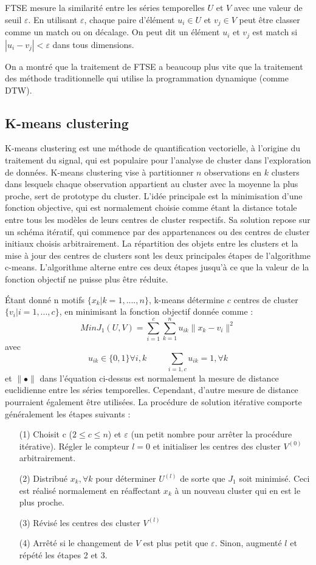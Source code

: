 FTSE mesure la similarité entre les séries temporelles $U$ et $V$ avec une valeur de seuil $\varepsilon$. En utilisant $\varepsilon$, chaque paire d'élément $u_i \in U$ et $v_j \in V$ peut être classer comme un match ou on décalage. On peut dit un élément $u_i$ et $v_j$ est match si $| u_i - v_j | <  \varepsilon$ dans tous dimensions.

On a montré que la traitement de FTSE a beaucoup plus vite que la traitement des méthode traditionnelle qui utilise la programmation dynamique (comme DTW).
\subsection{K-means clustering}
K-means clustering est une méthode de quantification vectorielle, à l'origine du traitement du signal, qui est populaire pour l'analyse de cluster dans l'exploration de données. K-means clustering vise à partitionner $n$ observations en $k$ clusters dans lesquels chaque observation appartient au cluster avec la moyenne la plus proche, sert de prototype du cluster. L'idée principale est la minimisation d'une fonction objective, qui est normalement choisie comme étant la distance totale entre tous les modèles de leurs centres de cluster respectifs. Sa solution repose sur un schéma itératif, qui commence par des appartenances ou des centres de cluster initiaux choisis arbitrairement. La répartition des objets entre les clusters et la mise à jour des centres de clusters sont les deux principales étapes de l'algorithme c-means. L'algorithme alterne entre ces deux étapes jusqu'à ce que la valeur de la fonction objectif ne puisse plus être réduite.

Étant donné n motifs $ \{ x_k | k = 1,...., n\}$, k-means détermine $c$ centres de cluster $\{ v_i | i = 1,..., c\}$, en minimisant la fonction objectif donnée comme : 
$$Min J_1(U, V) = \sum_{i = 1}^{c} \sum_{k = 1}^{n} u_{ik} \parallel x_k - v_i \parallel ^2 $$
avec 
$$u_{ik} \in \{0, 1\} \forall i,k \hspace{1cm} \sum_{i = 1, c} u_{ik} = 1, \forall k$$
et $\parallel \bullet \parallel$ dans l'équation ci-dessus est normalement la mesure de distance euclidienne entre les séries temporelles. Cependant, d'autre mesure de distance pourraient également être utilisées. La procédure de solution itérative comporte généralement les étapes suivants : 
\begin{itemize}
\item[(1)] Choisit c ($2 \leq c \leq n$) et $\varepsilon$ (un petit nombre pour arrêter la procédure itérative). Régler le compteur $l = 0$ et initialiser les centres des cluster $V^(0)$ arbitrairement.
\item[(2)] Distribué $x_k, \forall k $ pour déterminer $U^{(l)}$ de sorte que $J_1$ soit minimisé. Ceci est réalisé normalement en réaffectant $x_k$ à un nouveau cluster qui en est le plus proche.
\item[(3)] Révisé les centres des cluster $V^(l)$
\item[(4)] Arrêté si le changement de $V$ est plus petit que $\varepsilon$. Sinon, augmenté $l$ et répété les étapes 2 et 3.
\end{itemize}

